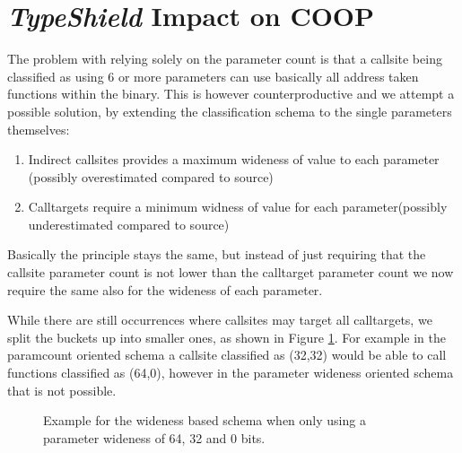 \section{\textit{TypeShield} Impact on COOP}
\label{TypeShild Impact on COOP}
The problem with relying solely on the parameter count is that a callsite being classified as using 6 or more parameters can use basically all address taken functions within the binary. This is however counterproductive and we attempt a possible solution, by extending the classification schema to the single parameters themselves:

\begin{enumerate}
\item Indirect callsites provides a maximum wideness of value to each parameter (possibly overestimated compared to source)
\item Calltargets require a minimum widness of value for each parameter(possibly underestimated compared to source)
\end{enumerate}

Basically the principle stays the same, but instead of just requiring that the callsite parameter count is not lower than the calltarget parameter count we now require the same also for the wideness of each parameter.

While there are still occurrences where callsites may target all calltargets, we split the buckets up into smaller ones, as shown in Figure \ref{fig:lattice3264}. For example in the paramcount oriented schema a callsite classified as (32,32) would be able to call functions classified as (64,0), however in the parameter wideness oriented schema that is not possible.

\begin{figure}[!h]
\centering
{}
\caption{Example for the wideness based schema when only using a parameter wideness of 64, 32 and 0 bits.}
\label{fig:lattice3264}
\end{figure}